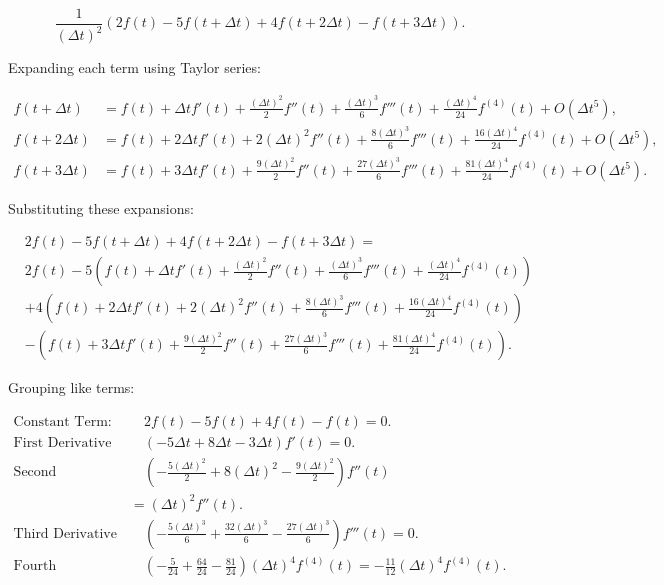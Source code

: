 \documentclass[12pt]{article}
\begin{document}
\begin{enumerate}
\begin{equation}
    \frac{1}{(\Delta t)^2} \left( 2f(t) - 5f(t+\Delta t) + 4f(t+2\Delta t) - f(t+3\Delta t) \right).
\end{equation}

Expanding each term using Taylor series:

\begin{align*}
    f(t+\Delta t) &= f(t) + \Delta t f'(t) + \frac{(\Delta t)^2}{2} f''(t) + \frac{(\Delta t)^3}{6} f'''(t) + \frac{(\Delta t)^4}{24} f^{(4)}(t) + O(\Delta t^5), \\
    f(t+2\Delta t) &= f(t) + 2\Delta t f'(t) + 2 (\Delta t)^2 f''(t) + \frac{8(\Delta t)^3}{6} f'''(t) + \frac{16(\Delta t)^4}{24} f^{(4)}(t) + O(\Delta t^5), \\
    f(t+3\Delta t) &= f(t) + 3\Delta t f'(t) + \frac{9(\Delta t)^2}{2} f''(t) + \frac{27(\Delta t)^3}{6} f'''(t) + \frac{81(\Delta t)^4}{24} f^{(4)}(t) + O(\Delta t^5).
\end{align*}

Substituting these expansions:

\begin{align*}
    &2f(t) - 5f(t+\Delta t) + 4f(t+2\Delta t) - f(t+3\Delta t) = \\
    &2f(t) - 5\left( f(t) + \Delta t f'(t) + \frac{(\Delta t)^2}{2} f''(t) + \frac{(\Delta t)^3}{6} f'''(t) + \frac{(\Delta t)^4}{24} f^{(4)}(t) \right) \\
    &+ 4\left( f(t) + 2\Delta t f'(t) + 2 (\Delta t)^2 f''(t) + \frac{8(\Delta t)^3}{6} f'''(t) + \frac{16(\Delta t)^4}{24} f^{(4)}(t) \right) \\
    &- \left( f(t) + 3\Delta t f'(t) + \frac{9(\Delta t)^2}{2} f''(t) + \frac{27(\Delta t)^3}{6} f'''(t) + \frac{81(\Delta t)^4}{24} f^{(4)}(t) \right).
\end{align*}

Grouping like terms:

\begin{align*}
    \text{Constant Term:} & \quad 2f(t) - 5f(t) + 4f(t) - f(t) = 0. \\
    \text{First Derivative Term:} & \quad (-5\Delta t + 8\Delta t - 3\Delta t) f'(t) = 0. \\
    \text{Second Derivative Term:} & \quad \left( -\frac{5(\Delta t)^2}{2} + 8(\Delta t)^2 - \frac{9(\Delta t)^2}{2} \right) f''(t) \\
    & = (\Delta t)^2 f''(t). \\
    \text{Third Derivative Term:} & \quad \left( -\frac{5(\Delta t)^3}{6} + \frac{32(\Delta t)^3}{6} - \frac{27(\Delta t)^3}{6} \right) f'''(t) = 0. \\
    \text{Fourth Derivative Term:} & \quad \left( -\frac{5}{24} + \frac{64}{24} - \frac{81}{24} \right) (\Delta t)^4 f^{(4)}(t) = -\frac{11}{12} (\Delta t)^4 f^{(4)}(t).
\end{align*}


\end{enumerate}
\end{document}
